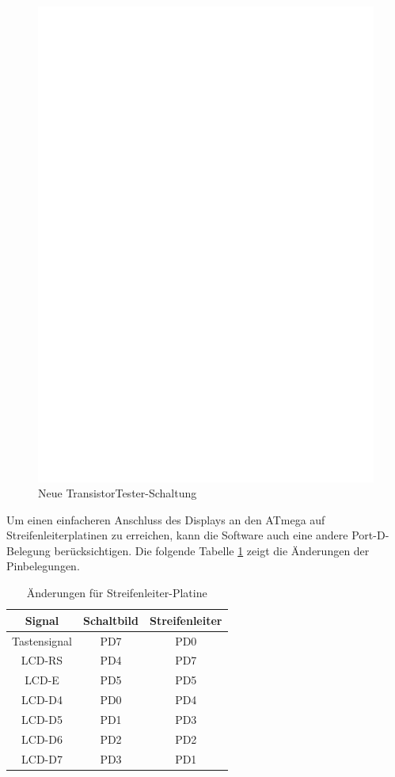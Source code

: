 \begin{figure}[H]
\centering
\includegraphics[width=18cm]{../FIG/ttester.eps}
\caption{Neue TransistorTester-Schaltung}
\label{fig:ttester}
\end{figure}

Um einen einfacheren Anschluss des Displays an den ATmega auf Streifenleiterplatinen zu erreichen,
kann die Software auch eine andere Port-D-Belegung ber\"ucksichtigen.
Die folgende Tabelle \ref{tab:grid-change} zeigt die \"Anderungen der Pinbelegungen.

\begin{table}[H]
  \begin{center}
    \begin{tabular}{| c | c | c |}
    \hline
       Signal & Schaltbild & Streifenleiter\\
    \hline
    Tastensignal  &  PD7   &  PD0 \\
    LCD-RS    &  PD4      & PD7 \\
    LCD-E     &  PD5   & PD5 \\
    LCD-D4    &  PD0   & PD4 \\
    LCD-D5    &  PD1   & PD3 \\
    LCD-D6    &  PD2   & PD2 \\
    LCD-D7    &  PD3   & PD1 \\
    \hline
    \end{tabular}
  \end{center}
  \caption{\"Anderungen f\"ur Streifenleiter-Platine}
  \label{tab:grid-change}
\end{table}

